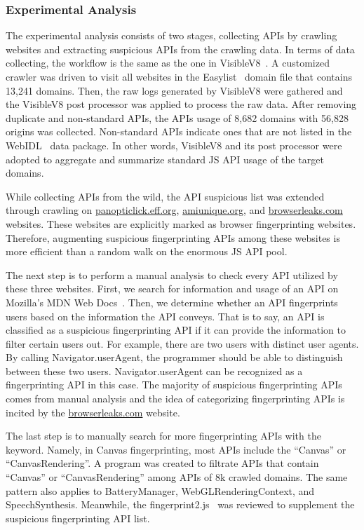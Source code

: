 \subsubsection{Experimental Analysis}

The experimental analysis consists of two stages, collecting APIs by crawling websites and extracting suspicious APIs from the crawling data. In terms of data collecting, the workflow is the same as the one in VisibleV8~\cite{vv8-imc19}. A customized crawler was driven to visit all websites in the Easylist~\cite{Easylist} domain file that contains 13,241 domains. Then, the raw logs generated by VisibleV8 were gathered and the VisibleV8 post processor was applied to process the raw data. After removing duplicate and non-standard APIs, the APIs usage of 8,682 domains with 56,828 origins was collected. Non-standard APIs indicate ones that are not listed in the WebIDL~\cite{webidl} data package. In other words, VisibleV8 and its post processor were adopted to aggregate and summarize standard JS API usage of the target domains.

While collecting APIs from the wild, the API suspicious list was extended through crawling on \url{panopticlick.eff.org}, \url{amiunique.org}, and \url{browserleaks.com} websites. These websites are explicitly marked as browser fingerprinting websites. Therefore, augmenting suspicious fingerprinting APIs among these websites is more efficient than a random walk on the enormous JS API pool.

The next step is to perform a manual analysis to check every API utilized by these three websites. First, we search for information and usage of an API on Mozilla's MDN Web Docs~\cite{mdnwebdocs}. Then, we determine whether an API fingerprints users based on the information the API conveys. That is to say, an API is classified as a suspicious fingerprinting API if it can provide the information to filter certain users out. For example, there are two users with distinct user agents. By calling Navigator.userAgent, the programmer should be able to distinguish between these two users. Navigator.userAgent can be recognized as a fingerprinting API in this case. The majority of suspicious fingerprinting APIs comes from manual analysis and the idea of categorizing fingerprinting APIs is incited by the \url{browserleaks.com} website. 

The last step is to manually search for more fingerprinting APIs with the keyword. Namely, in Canvas fingerprinting, most APIs include the ``Canvas'' or ``CanvasRendering''. A program was created to filtrate APIs that contain ``Canvas'' or ``CanvasRendering'' among APIs of 8k crawled domains. The same pattern also applies to BatteryManager, WebGLRenderingContext, and SpeechSynthesis. Meanwhile, the fingerprint2.js~\cite{fingerprintjs2020Oct} was reviewed to supplement the suspicious fingerprinting API list.  

